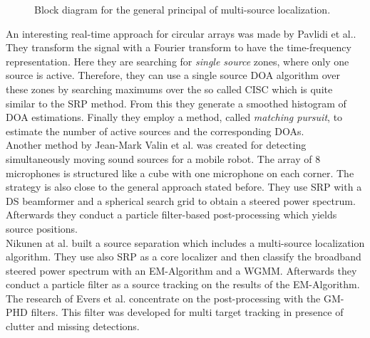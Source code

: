 \begin{figure}[!ht]
	\centering
{}
	\caption{Block diagram for the general principal of multi-source localization.}
	\label{fig:general_overview}
\end{figure}

An interesting real-time approach for circular arrays was made by Pavlidi et al.. They transform the signal with a Fourier transform to have the time-frequency representation. Here they are searching for \emph{single source} zones, where only one source is active. Therefore, they can use a single source \ac{DOA} algorithm over these zones by searching maximums over the so called \ac{CISC} which is quite similar to the \ac{SRP} method. From this they generate a smoothed histogram of \ac{DOA} estimations. Finally they employ a method, called \emph{matching pursuit}, to estimate the number of active sources and the corresponding \acp{DOA}. \cite{pavlidi2013real}\\
Another method by Jean-Mark Valin et al. was created for detecting simultaneously moving sound sources for a mobile robot. The array of 8 microphones is structured like a cube with one microphone on each corner. The strategy is also close to the general approach stated before. They use \ac{SRP} with a \ac{DS} beamformer and a spherical search grid to obtain a steered power spectrum. Afterwards they conduct a particle filter-based  post-processing which yields source positions. \cite{valin2007robust}\\
Nikunen at al. built a source separation which includes a multi-source localization algorithm. They use also \ac{SRP} as a core localizer and then classify the broadband steered power spectrum with an EM-Algorithm and a \ac{WGMM}. Afterwards they conduct a particle filter as a source tracking on the results of the EM-Algorithm.\cite{nikunen2018separation}\\
The research of Evers et al. concentrate on the post-processing with the \ac{GM-PHD} filters. This filter was developed for multi target tracking in presence of clutter and missing detections. \cite{evers2015bearing}

